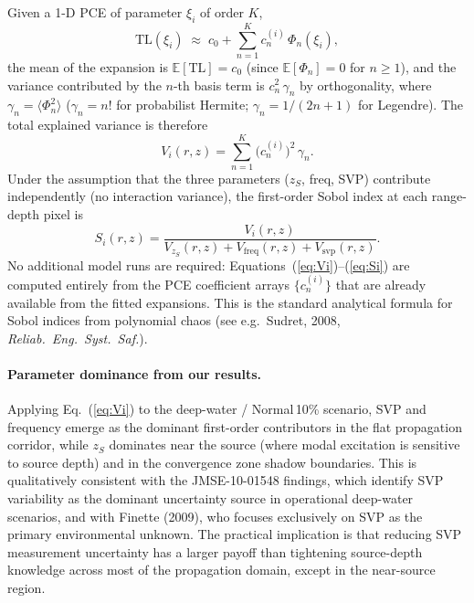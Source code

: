 \documentclass[11pt,a4paper]{article}
\newcommand{\EX}{\mathbb{E}}
\newcommand{\TL}{\mathrm{TL}}
\begin{document}
Given a 1-D PCE of parameter $\xi_i$ of order $K$,
\begin{equation}
  \TL(\xi_i) \;\approx\; c_0 + \sum_{n=1}^{K} c_n^{(i)}\,\Phi_n(\xi_i),
\end{equation}
the mean of the expansion is $\EX[\TL] = c_0$ (since $\EX[\Phi_n] = 0$ for $n \geq 1$),
and the variance contributed by the $n$-th basis term is
$c_n^2\,\gamma_n$ by orthogonality, where $\gamma_n = \langle\Phi_n^2\rangle$
($\gamma_n = n!$ for probabilist Hermite; $\gamma_n = 1/(2n+1)$ for Legendre).
The total explained variance is therefore
\begin{equation}
  V_i(r,z) = \sum_{n=1}^{K} \bigl(c_n^{(i)}\bigr)^2 \,\gamma_n.
  \label{eq:Vi}
\end{equation}
Under the assumption that the three parameters ($z_S$, freq, SVP) contribute
independently (no interaction variance), the first-order Sobol index at each
range-depth pixel is
\begin{equation}
  S_i(r,z) = \frac{V_i(r,z)}{V_{z_S}(r,z) + V_\text{freq}(r,z) + V_\text{svp}(r,z)}.
  \label{eq:Si}
\end{equation}
No additional model runs are required: Equations~(\ref{eq:Vi})--(\ref{eq:Si})
are computed entirely from the PCE coefficient arrays $\{c_n^{(i)}\}$ that are
already available from the fitted expansions.
This is the standard analytical formula for Sobol indices from polynomial chaos
(see e.g.\ Sudret, 2008, \emph{Reliab.\ Eng.\ Syst.\ Saf.}).

\paragraph{Parameter dominance from our results.}
Applying Eq.~(\ref{eq:Vi}) to the deep-water / Normal\,10\% scenario, SVP and
frequency emerge as the dominant first-order contributors in the flat propagation
corridor, while $z_S$ dominates near the source (where modal excitation is
sensitive to source depth) and in the convergence zone shadow boundaries.
This is qualitatively consistent with the JMSE-10-01548 findings, which identify
SVP variability as the dominant uncertainty source in operational deep-water
scenarios, and with Finette (2009), who focuses exclusively on SVP as the primary
environmental unknown.
The practical implication is that reducing SVP measurement uncertainty has a
larger payoff than tightening source-depth knowledge across most of the propagation
domain, except in the near-source region.

\end{document}
